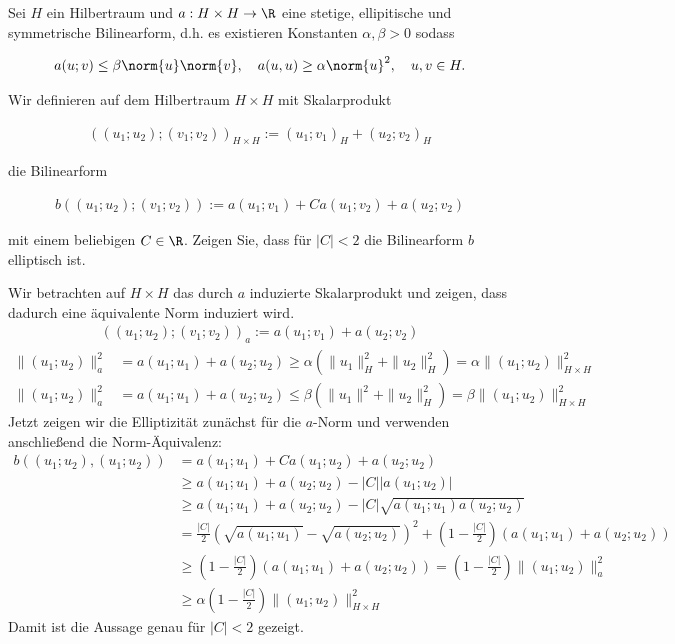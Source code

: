 
\begin{exercise}
Sei $H$ ein Hilbertraum und $a: H \times H \rightarrow \R$ eine stetige,
ellipitische und symmetrische Bilinearform, d.h. es existieren Konstanten
$\alpha, \beta > 0$ sodass

\begin{align*}
  a(u;v)
  \leq
  \beta \norm{u}\norm{v},
  \quad
  a(u,u) \geq \alpha \norm{u}^2,
  \quad
  u,v \in H.
\end{align*}

Wir definieren auf dem Hilbertraum $H \times H$ mit Skalarprodukt

\begin{align*}
  ((u_1;u_2);(v_1;v_2))_{H \times H} := (u_1;v_1)_H + (u_2;v_2)_H
\end{align*}

die Bilinearform

\begin{align*}
  b((u_1;u_2);(v_1;v_2)) := a(u_1;v_1) + Ca(u_1;v_2) + a(u_2;v_2)
\end{align*}

mit einem beliebigen $C \in \R$. Zeigen Sie, dass für $|C| < 2$ die Bilinearform $b$
elliptisch ist.
\end{exercise}


\begin{solution}
Wir betrachten auf $H \times H$ das durch $a$ induzierte Skalarprodukt und zeigen,
dass dadurch eine äquivalente Norm induziert wird.
\begin{align*}
  ((u_1;u_2);(v_1;v_2))_a := a(u_1;v_1) + a(u_2;v_2)
\end{align*}
\begin{align*}
  \|(u_1;u_2)\|_a^2 &= a(u_1;u_1) + a(u_2;u_2) \geq \alpha (\|u_1\|_H^2 + \|u_2\|_H^2)
  = \alpha \|(u_1;u_2)\|_{H \times H}^2 \\
  \|(u_1;u_2)\|_a^2 &= a(u_1;u_1) + a(u_2;u_2) \leq \beta (\|u_1\|^2 + \|u_2\|_H^2)
  = \beta \|(u_1;u_2)\|_{H \times H}^2
\end{align*}
Jetzt zeigen wir die Elliptizität zunächst für die $a$-Norm und verwenden anschließend
die Norm-Äquivalenz:
\begin{align*}
  b((u_1;u_2),(u_1;u_2)) &= a(u_1;u_1) + Ca(u_1;u_2) + a(u_2;u_2) \\
  &\geq a(u_1;u_1) + a(u_2;u_2) - |C||a(u_1;u_2)| \\
  &\geq a(u_1;u_1) + a(u_2;u_2) - |C|\sqrt{a(u_1;u_1)a(u_2;u_2)} \\
  &= \frac{|C|}{2}\left(\sqrt{a(u_1;u_1)} - \sqrt{a(u_2;u_2)}\right)^2
  + \left(1 - \frac{|C|}{2}\right)(a(u_1;u_1) + a(u_2;u_2)) \\
  &\geq \left(1 - \frac{|C|}{2}\right)(a(u_1;u_1) + a(u_2;u_2))
  = \left(1 - \frac{|C|}{2}\right)\|(u_1;u_2)\|_a^2 \\
  &\geq \alpha\left(1 - \frac{|C|}{2}\right)\|(u_1;u_2)\|_{H \times H}^2
\end{align*}
Damit ist die Aussage genau für $|C| < 2$ gezeigt.
\end{solution}

